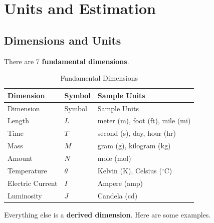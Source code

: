 \documentclass[
]{book}
\begin{document}
\hypertarget{part-units-and-estimation}{%
\part{Units and Estimation}\label{part-units-and-estimation}}

\hypertarget{dimensions-and-units}{%
\chapter{Dimensions and Units}\label{dimensions-and-units}}

There are 7 \textbf{fundamental dimensions}.

\begin{longtable}[]{@{}lll@{}}
\caption{Fundamental Dimensions}\tabularnewline
\toprule
Dimension & Symbol & Sample Units\tabularnewline
\midrule
\endfirsthead
\toprule
Dimension & Symbol & Sample Units\tabularnewline
\midrule
\endhead
Length & \(L\) & meter (m), foot (ft), mile (mi)\tabularnewline
Time & \(T\) & second (s), day, hour (hr)\tabularnewline
Mass & \(M\) & gram (g), kilogram (kg)\tabularnewline
Amount & \(N\) & mole (mol)\tabularnewline
Temperature & \(\theta\) & Kelvin (K), Celsius (\(^\circ \mbox{C}\))\tabularnewline
Electric Current & \(I\) & Ampere (amp)\tabularnewline
Luminosity & \(J\) & Candela (cd)\tabularnewline
\bottomrule
\end{longtable}

Everything else is a \textbf{derived dimension}. Here are some examples.
\end{document}
